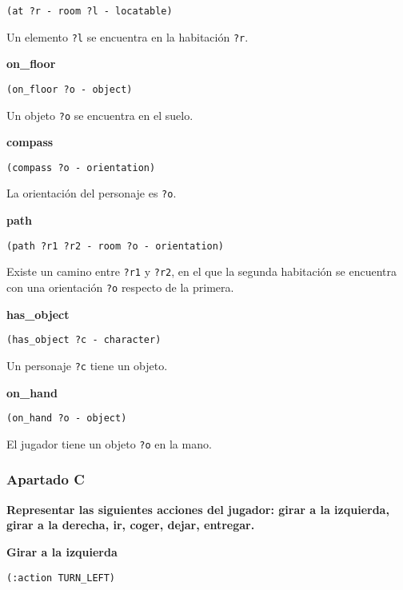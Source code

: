 \documentclass[11pt,a4paper]{article}
\begin{document}
\texttt{(at ?r - room ?l - locatable)}

\smallskip

Un elemento \texttt{?l} se encuentra en la habitación \texttt{?r}. 

\medskip

\large{\textbf{on\_floor}}

\texttt{(on\_floor ?o - object)}

\smallskip

Un objeto \texttt{?o} se encuentra en el suelo. 

\medskip

\large{\textbf{compass}}

\texttt{(compass ?o - orientation)}

\smallskip

La orientación del personaje es \texttt{?o}.

\medskip

\large{\textbf{path}}

\texttt{(path ?r1 ?r2 - room ?o - orientation)}

\smallskip

Existe un camino entre \texttt{?r1} y \texttt{?r2}, en el que la segunda habitación
se encuentra con una orientación \texttt{?o} respecto de la primera.

\medskip

\large{\textbf{has\_object}}

\texttt{(has\_object ?c - character)}

\smallskip

Un personaje \texttt{?c} tiene un objeto.

\medskip

\large{\textbf{on\_hand}}

\texttt{(on\_hand ?o - object)}

\smallskip

El jugador tiene un objeto \texttt{?o} en la mano.

\subsubsection{Apartado C}

\textbf{Representar las siguientes acciones del jugador: girar a la izquierda, girar a la derecha, ir, coger, dejar, entregar.}

\bigskip

\large{\textbf{Girar a la izquierda}}

\texttt{(:action TURN\_LEFT)}
\end{document}
